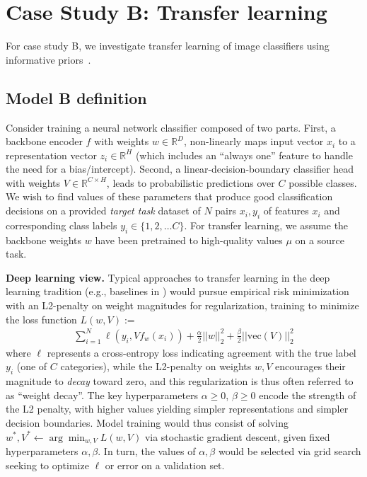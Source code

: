 \section{Case Study B: Transfer learning}

For case study B, we investigate transfer learning of image classifiers using informative priors~\citep{xuhong2018explicit,shwartz2022pre}.

\subsection{Model B definition}

Consider training a neural network classifier composed of two parts. First, a backbone encoder $f$ with weights $w \in \mathbb{R}^D$, non-linearly maps input vector $x_i$ to a representation vector $z_i \in \mathbb{R}^H$ (which includes an ``always one'' feature to handle the need for a bias/intercept). Second, a linear-decision-boundary classifier head with weights $V \in \mathbb{R}^{C \times H}$, leads to probabilistic predictions over $C$ possible classes. We wish to find values of these parameters that produce good classification decisions on a provided \emph{target task} dataset of $N$ pairs $x_i, y_i$ of features $x_i$ and corresponding class labels $y_i \in \{1, 2, \ldots C\}$. For transfer learning, we assume the backbone weights $w$ have been pretrained to high-quality values $\mu$ on a source task.


\textbf{Deep learning view.}
Typical approaches to transfer learning in the deep learning tradition (e.g., baselines in \citet{xuhong2018explicit}) would pursue empirical risk minimization with an L2-penalty on weight magnitudes for regularization, training to minimize the loss function $L(w, V) := $
\begin{align}
  \label{eq:loss_with_l2_penalty}
  \sum_{i=1}^N \ell(y_i, V f_w( x_i) ) + \frac{\alpha}{2} || w ||_2 ^2 + \frac{\beta}{2} || \text{vec}(V) ||_2 ^2 
\end{align}
where $\ell$ represents a cross-entropy loss indicating agreement with the true label $y_i$ (one of $C$ categories), while the L2-penalty on weights $w,V$ encourages their magnitude to \emph{decay} toward zero, and this regularization is thus often referred to as ``weight decay''.
The key hyperparameters $\alpha \geq 0$, $\beta \geq 0$ encode the strength of the L2 penalty, with higher values yielding simpler representations and simpler decision boundaries.
Model training would thus consist of solving $w^*, V^* \gets \arg\!\min_{w,V} L(w,V)$ via stochastic gradient descent, given fixed hyperparameters $\alpha, \beta$. 
In turn, the values of $\alpha,\beta$ would be selected via grid search seeking to optimize $\ell$ or error on a validation set. 

